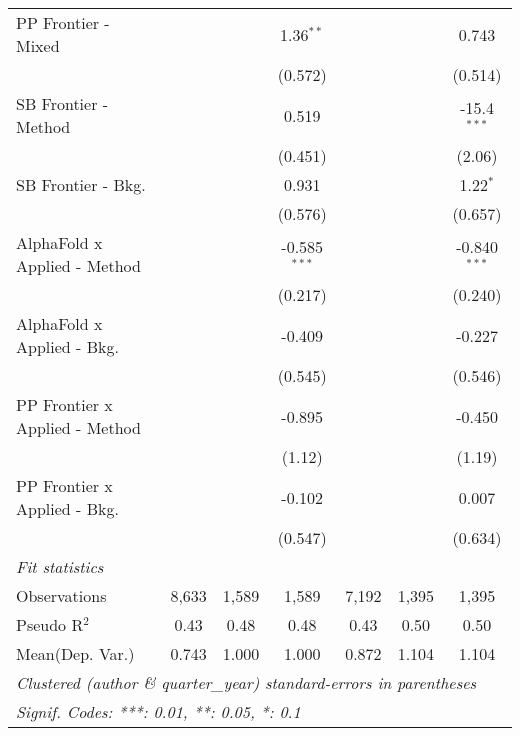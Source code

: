 \begin{tabular}{lcccccc}
   PP Frontier - Mixed            &                &                & 1.36$^{**}$    &                &                & 0.743\\   
                                  &                &                & (0.572)        &                &                & (0.514)\\   
   SB Frontier - Method           &                &                & 0.519          &                &                & -15.4$^{***}$\\   
                                  &                &                & (0.451)        &                &                & (2.06)\\   
   SB Frontier - Bkg.             &                &                & 0.931          &                &                & 1.22$^{*}$\\   
                                  &                &                & (0.576)        &                &                & (0.657)\\   
   AlphaFold x Applied - Method   &                &                & -0.585$^{***}$ &                &                & -0.840$^{***}$\\   
                                  &                &                & (0.217)        &                &                & (0.240)\\   
   AlphaFold x Applied - Bkg.     &                &                & -0.409         &                &                & -0.227\\   
                                  &                &                & (0.545)        &                &                & (0.546)\\   
   PP Frontier x Applied - Method &                &                & -0.895         &                &                & -0.450\\   
                                  &                &                & (1.12)         &                &                & (1.19)\\   
   PP Frontier x Applied - Bkg.   &                &                & -0.102         &                &                & 0.007\\   
                                  &                &                & (0.547)        &                &                & (0.634)\\   
   \midrule
   \emph{Fit statistics}\\
   Observations                   & 8,633          & 1,589          & 1,589          & 7,192          & 1,395          & 1,395\\  
   Pseudo R$^2$                   & 0.43           & 0.48           & 0.48           & 0.43           & 0.50           & 0.50\\  
Mean(Dep. Var.) & 0.743 & 1.000 & 1.000 & 0.872 & 1.104 & 1.104 \\
   \midrule \midrule
   \multicolumn{7}{l}{\emph{Clustered (author \& quarter\_year) standard-errors in parentheses}}\\
   \multicolumn{7}{l}{\emph{Signif. Codes: ***: 0.01, **: 0.05, *: 0.1}}\\
\end{tabular}
\par\endgroup
